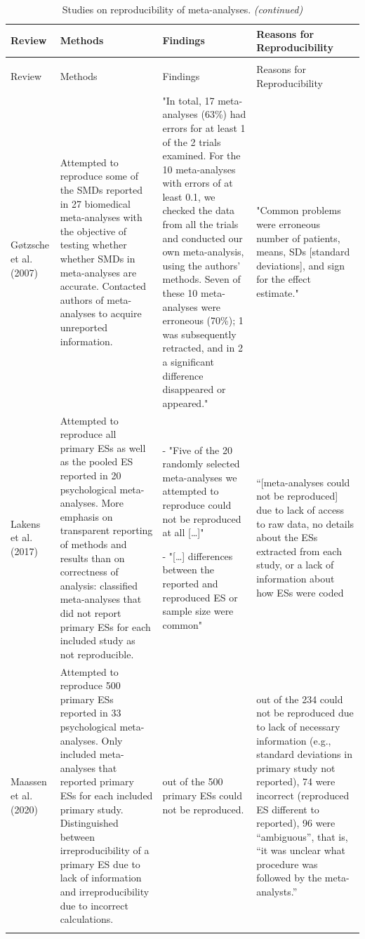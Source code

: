 \documentclass[
  man,floatsintext]{apa6}
\begin{document}
\begin{longtable}[t]{>{\raggedright\arraybackslash}p{5em}>{\raggedright\arraybackslash}p{12.5em}>{\raggedright\arraybackslash}p{12.5em}>{\raggedright\arraybackslash}p{12.5em}}
\caption{\label{tab:table3}Studies on reproducibility of meta-analyses.}\\
\toprule
Review & Methods & Findings & Reasons for Reproducibility\\
\midrule
\endfirsthead
\caption[]{\label{tab:table3}Studies on reproducibility of meta-analyses. \textit{(continued)}}\\
\toprule
Review & Methods & Findings & Reasons for Reproducibility\\
\midrule
\endhead
\midrule
\multicolumn{4}{r@{}}{}\
\endfoot
\bottomrule
\endlastfoot
Gøtzsche et al. (2007) & Attempted to reproduce some of the SMDs reported in 27 biomedical meta-analyses with the objective of testing whether whether SMDs in meta-analyses are accurate. Contacted authors of meta-analyses to acquire unreported information. & "In total, 17 meta-analyses (63\%) had errors for at least 1 of the 2 trials examined. For the 10 meta-analyses with errors of at least 0.1, we checked the data from all the trials and conducted our own meta-analysis, using the authors’ methods. Seven of these 10 meta-analyses were erroneous (70\%); 1 was subsequently retracted, and in 2 a significant difference disappeared or appeared." & "Common problems were erroneous number of patients, means, SDs [standard deviations], and sign for the effect estimate."\\
Lakens et al. (2017) & Attempted to reproduce all primary ESs as well as the pooled ES reported in 20 psychological meta-analyses. More emphasis on transparent reporting of methods and results than on correctness of analysis: classified meta-analyses that did not report primary ESs for each included study as not reproducible. & - "Five of the 20 randomly selected meta-analyses we attempted to reproduce could not be reproduced at all […]"

- "[…] differences between the reported and reproduced ES or sample size were common" & “[meta-analyses could not be reproduced] due to lack of access to raw data, no details about the ESs extracted from each study, or a lack of information about how ESs were coded\\
Maassen et al. (2020) & Attempted to reproduce 500 primary ESs reported in 33 psychological meta-analyses. Only included meta-analyses that reported primary ESs for each included primary study. Distinguished between irreproducibility of a primary ES due to lack of information and irreproducibility due to incorrect calculations. & 234 out of the 500 primary ESs could not be reproduced. & 54 out of the 234 could not be reproduced due to lack of necessary information (e.g., standard deviations in primary study not reported), 74 were incorrect (reproduced ES different to reported), 96 were “ambiguous”, that is, “it was unclear what procedure was followed by the meta-analysts.”\\*
\end{longtable}
\end{document}
